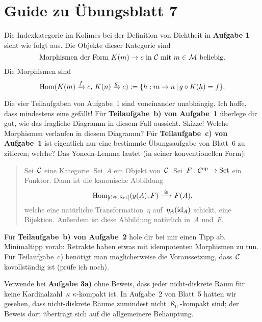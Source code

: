 \documentclass{uebblatt}
\begin{document}
\section*{Guide zu Übungsblatt 7}

Die Indexkategorie im Kolimes bei der Definition von Dichtheit in
\textbf{Aufgabe 1} sieht wie folgt aus. Die Objekte dieser Kategorie sind
\[ \text{Morphismen der Form~$K(m) \to c$ in~$\mathcal{C}$ mit~$m \in \mathcal{M}$ beliebig.} \]
Die Morphismen sind
\[ \mathrm{Hom}(K(m) \xrightarrow{f} c,\, K(n) \xrightarrow{g} c) \vcentcolon=
  \{ h : m \to n \,|\, g \circ K(h) = f \}. \]

Die vier Teilaufgaben von Aufgabe~1 sind voneinander unabhängig. Ich hoffe,
dass mindestens eine gefällt! Für \textbf{Teilaufgabe~b) von Aufgabe~1}
überlege dir gut, wie das fragliche Diagramm in diesem Fall aussieht. Skizze!
Welche Morphismen verlaufen in diesem Diagramm? Für \textbf{Teilaufgabe~c) von
Aufgabe~1} ist eigentlich nur eine bestimmte Übungsaufgabe von Blatt~6 zu
zitieren; welche? Das Yoneda-Lemma lautet (in seiner konventionellen Form):
\begin{quote}
Sei~$\mathcal{C}$ eine Kategorie. Sei~$A$ ein Objekt von~$\mathcal{C}$. Sei~$F : \mathcal{C}^{\mathrm{op}} \to \mathrm{Set}$
ein Funktor. Dann ist die kanonische Abbildung
\[ \mathrm{Hom}_{[\mathcal{C}^{\mathrm{op}},\mathrm{Set}]}(y(A), F) \stackrel{\cong}{\longrightarrow} F(A), \]
welche eine natürliche Transformation~$\eta$ auf~$\eta_A(\mathrm{id}_A)$ schickt, eine
Bijektion. Außerdem ist diese Abbildung natürlich in~$A$ und~$F$.
\end{quote}

Für \textbf{Teilaufgabe~b) von Aufgabe~2} hole dir bei mir einen Tipp ab.
Minimaltipp vorab: Retrakte haben etwas mit idempotenten Morphismen zu tun.
Für Teilaufgabe~c) benötigt man möglicherweise die Voraussetzung, dass~$\mathcal{C}$
kovollständig ist (prüfe ich noch).

Verwende bei \textbf{Aufgabe 3a)} ohne Beweis, dass jeder nicht-diskrete Raum für keine
Kardinalzahl~$\kappa$ $\kappa$-kompakt ist. In Aufgabe~2 von Blatt~5 hatten wir
gesehen, dass nicht-diskrete Räume zumindest nicht $\aleph_0$-kompakt sind; der
Beweis dort überträgt sich auf die allgemeinere Behauptung.
\end{document}
